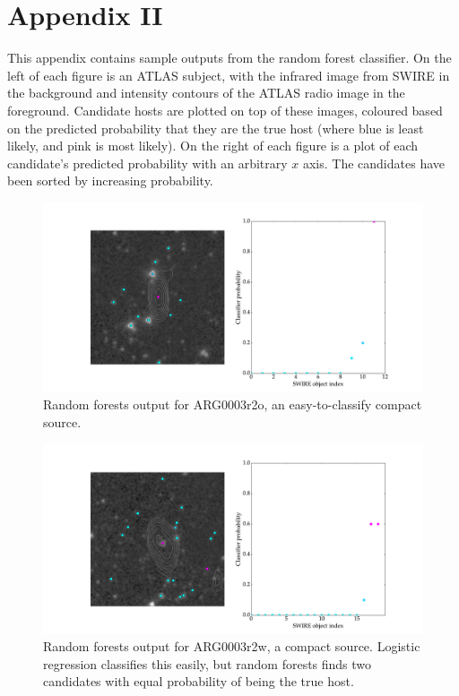 \documentclass[a4paper]{article}
\begin{document}
  \newpage
  \section*{Appendix II}

    This appendix contains sample outputs from the random forest classifier. On the left of each figure is an ATLAS subject, with the infrared image from SWIRE in the background and intensity contours of the ATLAS radio image in the foreground. Candidate hosts are plotted on top of these images, coloured based on the predicted probability that they are the true host (where blue is least likely, and pink is most likely). On the right of each figure is a plot of each candidate's predicted probability with an arbitrary $x$ axis. The candidates have been sorted by increasing probability.

    \begin{figure}[!ht]
      \centering
      \includegraphics[width=\linewidth]{images/ARG0003r2o_rf.pdf}
      \caption{Random forests output for ARG0003r2o, an easy-to-classify compact source.}
      \label{fig:ARG0003r2o_rf}
    \end{figure}

    \begin{figure}[!ht]
      \centering
      \includegraphics[width=\linewidth]{images/ARG0003r2w_rf.pdf}
      \caption{Random forests output for ARG0003r2w, a compact source. Logistic regression classifies this easily, but random forests finds two candidates with equal probability of being the true host.}
      \label{fig:ARG0003r2w_rf}
    \end{figure}
\end{document}
